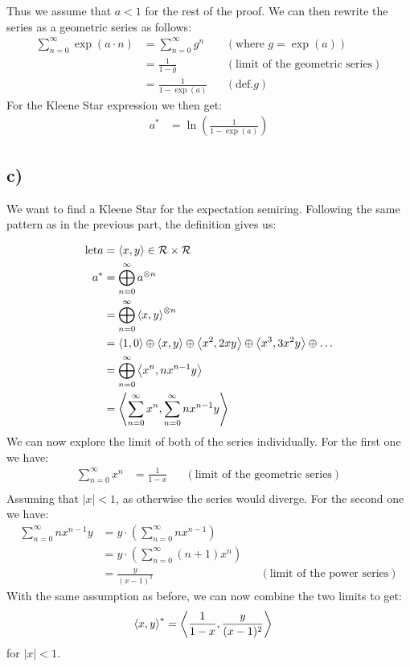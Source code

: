 \documentclass[a4paper,12pt]{ETHexercise}
\begin{document}
Thus we assume that $a < 1$ for the rest of the proof. We can then rewrite the series as a geometric series as follows: 
\begin{align}
    \sum^\infty_{n=0} \exp(a \cdot n) &= \sum^\infty_{n=0} g^n &&(\text{where } g = \exp(a))\\
    &= \frac{1}{1-g} &&(\text{limit of the geometric series})\\
    &= \frac{1}{1-\exp(a)} &&(\text{def.} g)  
\end{align}
For the Kleene Star expression we then get:
\begin{align*}
    a^* &= \ln \left( \frac{1}{1-\exp(a)} \right)
\end{align*}
\subsection*{c)}
We want to find a Kleene Star for the expectation semiring. Following the same pattern as in the previous part, the definition gives us:

\begin{align}
    \text{let} a &= \left\langle x, y\right\rangle \in \mathcal{R} \times \mathcal{R} \\
    a^* &= \bigoplus^{\infty}_{n=0}a^{\otimes n}\\
    &= \bigoplus^{\infty}_{n=0}\left\langle x, y\right\rangle^{\otimes n}\\
    &= \left\langle1, 0\right\rangle \oplus \left\langle x, y\right\rangle \oplus \left\langle x^2, 2xy\right\rangle \oplus \left\langle x^3, 3x^2y\right\rangle \oplus \dots\\
    &= \bigoplus^{\infty}_{n=0}\left\langle x^n, nx^{n-1}y\right\rangle\\
    &= \left\langle\sum^{\infty}_{n=0} x^n, \sum^{\infty}_{n=0} nx^{n-1}y\right\rangle
\end{align}
We can now explore the limit of both of the series individually. For the first one we have:
\begin{align}
    \sum^{\infty}_{n=0} x^n &= \frac{1}{1-x} &&(\text{limit of the geometric series})\\
\end{align}
Assuming that $|x| < 1$, as otherwise the series would diverge. For the second one we have:
\begin{align}
    \sum^{\infty}_{n=0} nx^{n-1}y  
    &= y \cdot (\sum^{\infty}_{n=0} nx^{n-1}) \\
    &= y \cdot (\sum^{\infty}_{n=0} (n+1)x^{n})  \\
    &= \frac{y}{(x-1)^2} &&(\text{limit of the power series})
\end{align}
With the same assumption as before, we can now combine the two limits to get:
\begin{align*}
    \left\langle x, y\right\rangle^* &= \left\langle\frac{1}{1-x}, \frac{y}{(x-1)^2}\right\rangle
\end{align*}
for $|x| < 1$.
\end{document}
